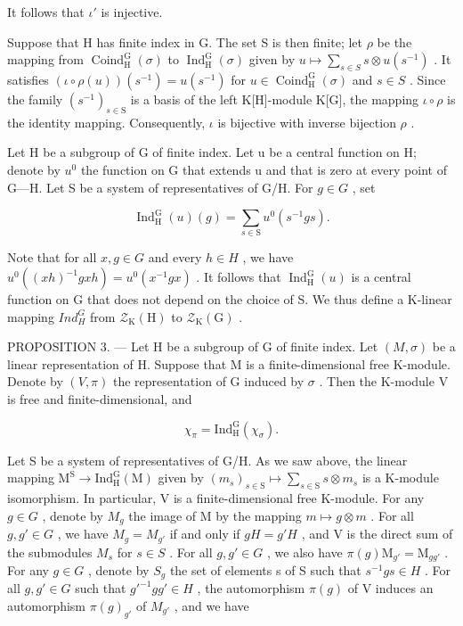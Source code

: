 It follows that \(\iota'\) is injective.

Suppose that H has finite index in G. The set S is then finite; let \(\rho\) be the mapping from \(\operatorname{Coind}_{\mathrm{H}}^{\mathrm{G}}(\sigma)\) to \(\operatorname{Ind}_{\mathrm{H}}^{\mathrm{G}}(\sigma)\) given by \(u \mapsto \sum_{s \in S} s \otimes u(s^{-1})\) . It satisfies \((\iota \circ \rho(u))(s^{-1}) = u(s^{-1})\) for \(u \in \operatorname{Coind}_{\mathrm{H}}^{\mathrm{G}}(\sigma)\) and \(s \in S\) . Since the family \((s^{-1})_{s\in\mathrm{S}}\) is a basis of the left K{[}H{]}-module K{[}G{]}, the mapping \(\iota\circ\rho\) is the identity mapping. Consequently, \(\iota\) is bijective with inverse bijection \(\rho\) .

Let H be a subgroup of G of finite index. Let u be a central function on H; denote by \(u^{0}\) the function on G that extends u and that is zero at every point of G---H. Let S be a system of representatives of G/H. For \(g \in G\) , set

\[
\operatorname{Ind} _ {\mathrm{H}} ^ {\mathrm{G}} (u) (g) = \sum_ {s \in \mathrm{S}} u ^ {0} (s ^ {- 1} g s).\tag{4}
\]

Note that for all \(x, g \in G\) and every \(h \in H\) , we have \(u^{0}((xh)^{-1}gxh) = u^{0}(x^{-1}gx)\) . It follows that \(\operatorname{Ind}_{\mathrm{H}}^{\mathrm{G}}(u)\) is a central function on G that does not depend on the choice of S. We thus define a K-linear mapping \(Ind_{H}^{G}\) from \(\mathcal{Z}_{\mathrm{K}}(\mathrm{H})\) to \(\mathcal{Z}_{\mathrm{K}}(\mathrm{G})\) .

PROPOSITION 3. --- Let H be a subgroup of G of finite index. Let \((M,\sigma)\) be a linear representation of H. Suppose that M is a finite-dimensional free K-module. Denote by \((V,\pi)\) the representation of G induced by \(\sigma\) . Then the K-module V is free and finite-dimensional, and

\[
\chi_ {\pi} = \mathrm{Ind} _ {\mathrm{H}} ^ {\mathrm{G}} (\chi_ {\sigma}).\tag{5}
\]

Let S be a system of representatives of G/H. As we saw above, the linear mapping \(\mathrm{M}^{\mathrm{S}}\to\mathrm{Ind}_{\mathrm{H}}^{\mathrm{G}}(\mathrm{M})\) given by \((m_{s})_{s\in\mathrm{S}}\mapsto\sum_{s\in\mathrm{S}}s\otimes m_{s}\) is a K-module isomorphism. In particular, V is a finite-dimensional free K-module. For any \(g\in G\) , denote by \(M_{g}\) the image of M by the mapping \(m\mapsto g\otimes m\) . For all \(g,g'\in G\) , we have \(M_{g}=M_{g'}\) if and only if \(gH=g'H\) , and V is the direct sum of the submodules \(M_{s}\) for \(s\in S\) . For all \(g,g'\in G\) , we also have \(\pi(g)\mathrm{M}_{g'}=\mathrm{M}_{gg'}\) . For any \(g\in G\) , denote by \(S_{g}\) the set of elements s of S such that \(s^{-1}gs\in H\) . For all \(g,g'\in G\) such that \(g'^{-1}gg'\in H\) , the automorphism \(\pi(g)\) of V induces an automorphism \(\pi(g)_{g'}\) of \(M_{g'}\) , and we have

